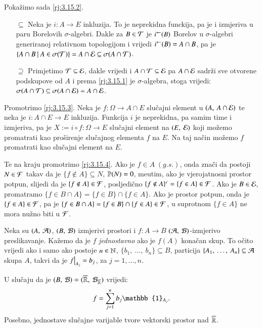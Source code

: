 \begin{rj}
    Poka\v zimo sada \ref{rj:3.15.2}.
    \begin{itemize}
        \item[$\subseteq$] Neka je $i : A \to E$ inkluzija.
        To je neprekidna funckija, pa je i izmjeriva u paru Borelovih $\sigma$-algebri.
        Dakle za $B \in \mathcal{T}$ je ${i}^{\leftarrow}(B)$ Borelov u $\sigma$-algebri generiranoj relativnom topologijom i vrijedi ${i}^{\leftarrow}(B) = A \cap B$, pa je\\
        $\{{A \cap B} \: | \: {A \in \sigma({\mathcal{T}})}\} = A \cap \mathcal{E} \subseteq \sigma({A \cap \mathcal{T}})$.
        \item[$\supseteq$] Primjetimo $\mathcal{T} \subseteq \mathcal{E}$, dakle vrijedi i $A \cap \mathcal{T} \subseteq \mathcal{E}$ pa $A \cap \mathcal{E}$ sadr\v zi sve otvorene podskupove od $A$ i prema \ref{rj:3.15.1} je $\sigma$-algebra, stoga vrijedi:\\
        $\sigma({A \cap \mathcal{T}}) \subseteq \sigma({A \cap \mathcal{E}}) = A \cap \mathcal{E}$.
    \end{itemize}
    
    Promotrimo \ref{rj:3.15.3}.
    Neka je $f: \Omega \to A \cap E$ slu\v cajni element u $({A}, \: {A \cap \mathcal{E}})$ te neka je $i : A \cap E \to E$ inkluzija.
    Funkcija $i$ je neprekidna, pa samim time i izmjeriva, pa je
    $X := i \circ f : \Omega \to E$ slu\v cajni element na $({E}, \: {\mathcal{E}})$ koji mo\v zemo promatrati kao pro\v sirenje slu\v cajnog elementa $f$ na $E$.
    Na taj na\v cin mo\v zemo $f$ promatrati kao slu\v cajni element na $E$.

    Te na kraju promotrimo \ref{rj:3.15.4}.
    Ako je $f \in A \; (g.s.)$, onda zna\v ci da postoji $N \in \mathcal{F}$ takav da je $\{f \notin A\} \subseteq N$, $\mathbb{P}({N}) = 0$, me\dj utim, ako je vjerojatnosni prostor potpun, slijedi da je $\{f \notin A\} \in \mathcal{F}$, posljedi\v cno $\{f \notin A\}^c = \{f \in A\} \in \mathcal{F}$.
    Ako je $B \in \mathcal{E}$, promatramo $\{f \in B \cap A\} = \{ f \in B \} \cap \{f \in A\}$.
    Ako je prostor potpun, onda je $\{f \in A\} \in \mathcal{F}$, pa je $\{f \in B \cap A\} = \{ f \in B \} \cap \{f \in A\} \in \mathcal{F}$, u suprotnom $\{f \in A\}$ ne mora nu\v zno biti u $\mathcal{F}$.
\end{rj}


\begin{pr}  \label{pr:3.16}
    Neka su $(A, \: \mathcal{A})$, $(B, \: \mathcal{B})$ izmjerivi prostori i $f: A \to B$ $(\mathcal{A}, \: \mathcal{B})$-izmjerivo preslikavanje.
    Ka\v zemo da je $f$ \emph{jednostavno} ako je $f(A)$ kona\v can skup. To o\v cito vrijedi ako i samo ako postoje $n \in \mathbb{N}$, $\{ b_1, \: \dots, \: b_n \} \subseteq B$, particija $\{ A_1, \: \dots, \: A_n \} \subseteq \mathcal{A}$ skupa $A$, takvi da je $\restr{f}{A_j} = b_j$, za $j = 1, \dots, n$.
    
    U slu\v caju da je $(B, \: \mathcal{B}) = (\overline{\mathbb{R}}, \: \mathcal{B}_{\overline{\mathbb{R}}})$ vrijedi:
    \begin{equation*}
        f = \suma{j = 1}{n} b_j \mathbb{1}_{A_j}.
    \end{equation*}
    Posebno, jednostave slu\v cajne varijable tvore vektorski prostor nad $\overline{\mathbb{R}}$.
\end{pr}


